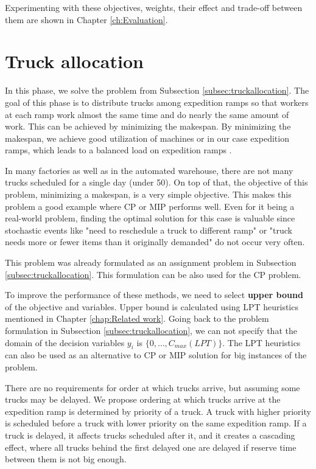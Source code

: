 \documentclass{ctuthesis}
\begin{document}
 Experimenting with these objectives, weights, their effect and trade-off between them are shown in Chapter \ref{ch:Evaluation}.


\section{Truck allocation}
\label{sec:truckallocationprop}
In this phase, we solve the problem from Subsection \ref{subsec:truckallocation}. The goal of this phase is to distribute trucks among expedition ramps so that workers at each ramp work almost the same time and do nearly the same amount of work. This can be achieved by minimizing the makespan. By minimizing the makespan, we achieve good utilization of machines or in our case expedition ramps, which leads to a balanced load on expedition ramps \cite{pinedo}. 

In many factories as well as in the automated warehouse, there are not many trucks scheduled for a single day (under 50). On top of that, the objective of this problem, minimizing a makespan, is a very simple objective. This makes this problem a good example where CP or MIP performs well. Even for it being a real-world problem, finding the optimal solution for this case is valuable since stochastic events like "need to reschedule a truck to different ramp" or "truck needs more or fewer items than it originally demanded" do not occur very often.

This problem was already formulated as an assignment problem in Subsection \ref{subsec:truckallocation}. This formulation can be also used for the CP problem.

To improve the performance of these methods, we need to select \textbf{upper bound} of the objective and variables. Upper bound is calculated using LPT heuristics mentioned in Chapter \ref{chap:Related work}. Going back to the problem formulation in Subsection \ref{subsec:truckallocation}, we can not specify that the domain of the decision variables $y_i$ is $\{0, \ldots, C_{max}(LPT)\}$. The LPT heuristics can also be used as an alternative to CP or MIP solution for big instances of the problem.

There are no requirements for order at which trucks arrive, but assuming some trucks may be delayed. We propose ordering at which trucks arrive at the expedition ramp is determined by priority of a truck. A truck with higher priority is scheduled before a truck with lower priority on the same expedition ramp. If a truck is delayed, it affects trucks scheduled after it, and it creates a cascading effect, where all trucks behind the first delayed one are delayed if reserve time between them is not big enough.
\end{document}
